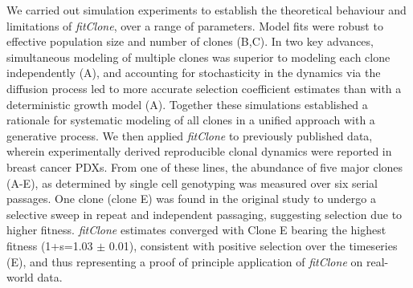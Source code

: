 We carried out simulation experiments to establish the theoretical behaviour and limitations of \textit{fitClone}, over a range of parameters. Model fits were robust to effective population size and number of clones (B,C). In two key advances, simultaneous modeling of multiple clones was superior to modeling each clone independently (A), and accounting for stochasticity in the dynamics via the diffusion process led to more accurate selection coefficient estimates than with a deterministic growth model (A). Together these simulations established a rationale for systematic modeling of all clones in a unified approach with a generative process. We then applied \textit{fitClone} to previously published data, wherein experimentally derived reproducible clonal dynamics were reported in breast cancer PDXs\cite{Eirew2015-sg}. From one of these lines, the abundance of five major clones (A-E), as determined by single cell genotyping was measured over six serial passages. One clone (clone E) was found in the original study to undergo a selective sweep in repeat and independent passaging\cite{Eirew2015-sg}, suggesting selection due to higher fitness. \textit{fitClone} estimates converged with Clone E bearing the highest fitness (1+s=1.03 $\pm$ 0.01), consistent with positive selection over the timeseries (E), and thus representing a proof of principle application of \textit{fitClone} on real-world data. 

